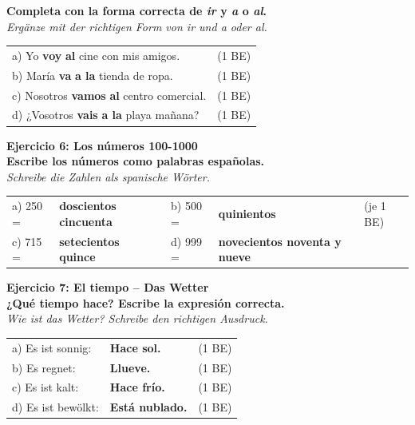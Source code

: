 \documentclass[11pt, a4paper]{article}
\newcommand{\punktebox}[1]{\hfill\fbox{\scriptsize \_\_/#1}}
\newcommand{\lsg}[1]{\textcolor{loesung}{\textbf{#1}}}
\newcommand{\aufgabe}[3]{%
    \textbf{\textcolor{spanisch}{Ejercicio #1: #2}} \punktebox{#3}\\[2pt]
}
\newcommand{\enunciado}[2]{%
    \textbf{#1}\\[1pt]
    {\small\textit{#2}}%
}
\begin{document}
\enunciado{Completa con la forma correcta de \emph{ir} y \emph{a} o \emph{al}.}{Ergänze mit der richtigen Form von \emph{ir} und \emph{a} oder \emph{al}.}

\vspace{6pt}

\begin{tabular}{@{}p{12cm}p{2cm}@{}}
a) Yo \lsg{voy} \lsg{al} cine con mis amigos. & (1 BE) \\[8pt]
b) María \lsg{va} \lsg{a la} tienda de ropa. & (1 BE) \\[8pt]
c) Nosotros \lsg{vamos} \lsg{al} centro comercial. & (1 BE) \\[8pt]
d) ¿Vosotros \lsg{vais} \lsg{a la} playa mañana? & (1 BE) \\
\end{tabular}

\vspace{10pt}


\aufgabe{6}{Los números 100-1000}{4}

\enunciado{Escribe los números como palabras españolas.}{Schreibe die Zahlen als spanische Wörter.}

\vspace{6pt}

\begin{tabular}{@{}p{2cm}p{5.5cm}p{2cm}p{5.5cm}p{2cm}@{}}
a) 250 = & \lsg{doscientos cincuenta} & b) 500 = & \lsg{quinientos} & (je 1 BE) \\[8pt]
c) 715 = & \lsg{setecientos quince} & d) 999 = & \lsg{novecientos noventa y nueve} & \\
\end{tabular}

\vspace{10pt}


\aufgabe{7}{El tiempo -- Das Wetter}{4}

\enunciado{¿Qué tiempo hace? Escribe la expresión correcta.}{Wie ist das Wetter? Schreibe den richtigen Ausdruck.}

\vspace{6pt}

\begin{tabular}{@{}p{5cm}p{6cm}p{2cm}@{}}
a) Es ist sonnig: & \lsg{Hace sol.} & (1 BE) \\[8pt]
b) Es regnet: & \lsg{Llueve.} & (1 BE) \\[8pt]
c) Es ist kalt: & \lsg{Hace frío.} & (1 BE) \\[8pt]
d) Es ist bewölkt: & \lsg{Está nublado.} & (1 BE) \\
\end{tabular}
\end{document}
